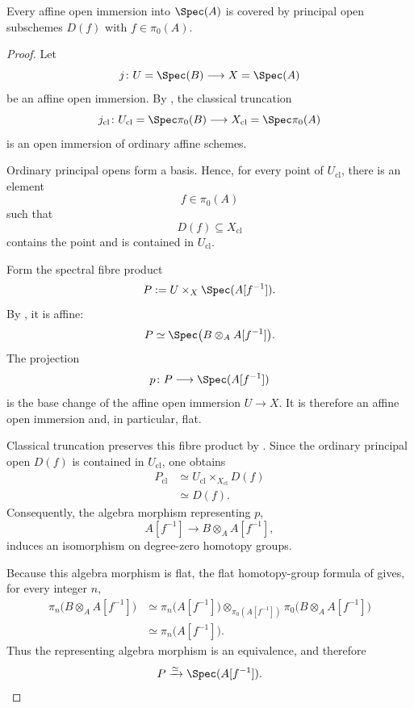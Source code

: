\begin{proposition}
\label{prop:principal-opens-basis}
Every affine open immersion into $\Spec(A)$ is covered by principal open
subschemes $D(f)$ with $f\in\pi_0(A)$.
\end{proposition}
\begin{proof}
Let
\[
    j
    \colon
    U=\Spec(B)
    \longrightarrow
    X=\Spec(A)
\]
be an affine open immersion. By
,
the classical truncation
\[
    j_{\mathrm{cl}}
    \colon
    U_{\mathrm{cl}}
    =
    \Spec\pi_0(B)
    \longrightarrow
    X_{\mathrm{cl}}
    =
    \Spec\pi_0(A)
\]
is an open immersion of ordinary affine schemes.

Ordinary principal opens form a basis. Hence, for every point of
\(U_{\mathrm{cl}}\), there is an element
\[
    f\in\pi_0(A)
\]
such that
\[
    D(f)
    \subseteq
    X_{\mathrm{cl}}
\]
contains the point and is contained in \(U_{\mathrm{cl}}\).

Form the spectral fibre product
\[
    P
    :=
    U
    \times_X
    \Spec(A[f^{-1}]).
\]
By
,
it is affine:
\[
    P
    \simeq
    \Spec
    \bigl(
        B\otimes_AA[f^{-1}]
    \bigr).
\]
The projection
\[
    p
    \colon
    P
    \longrightarrow
    \Spec(A[f^{-1}])
\]
is the base change of the affine open immersion \(U\to X\). It is
therefore an affine open immersion and, in particular, flat.

Classical truncation preserves this fibre product by
. Since the ordinary
principal open \(D(f)\) is contained in \(U_{\mathrm{cl}}\), one obtains
\[
\begin{aligned}
    P_{\mathrm{cl}}
    &\simeq
    U_{\mathrm{cl}}
    \times_{X_{\mathrm{cl}}}
    D(f)
    \\
    &\simeq
    D(f).
\end{aligned}
\]
Consequently, the algebra morphism representing \(p\),
\[
    A[f^{-1}]
    \longrightarrow
    B\otimes_AA[f^{-1}],
\]
induces an isomorphism on degree-zero homotopy groups.

Because this algebra morphism is flat, the flat homotopy-group formula
of  gives, for every integer \(n\),
\[
\begin{aligned}
    \pi_n
    \bigl(
        B\otimes_AA[f^{-1}]
    \bigr)
    &\simeq
    \pi_n
    \bigl(
        A[f^{-1}]
    \bigr)
    \otimes_{\pi_0(A[f^{-1}])}
    \pi_0
    \bigl(
        B\otimes_AA[f^{-1}]
    \bigr)
    \\
    &\simeq
    \pi_n
    \bigl(
        A[f^{-1}]
    \bigr).
\end{aligned}
\]
Thus the representing algebra morphism is an equivalence, and therefore
\[
    P
    \xrightarrow{\simeq}
    \Spec(A[f^{-1}]).
\]


\end{proof}
